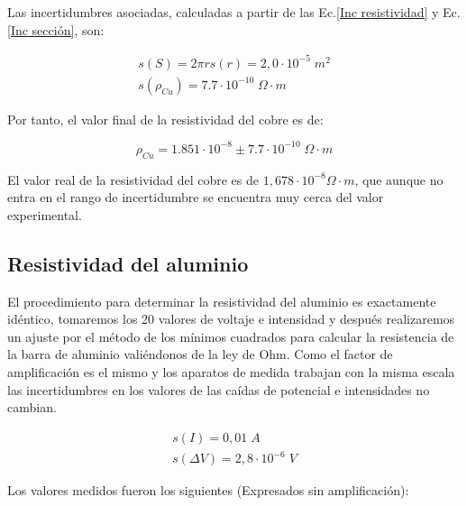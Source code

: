 \documentclass[a4paper,12pt,titlepage]{article}
\begin{document}
Las incertidumbres asociadas, calculadas a partir de las Ec.\ref{Inc resistividad} y Ec.\ref{Inc sección}, son:

\begin{equation}
    \begin{gathered}
        s(S) = 2\pi r s(r) = 2,0 \cdot 10^{-5} \; m^2
        \\
        s(\rho_{Cu}) = 7.7 \cdot 10^{-10} \; \Omega \cdot m
    \end{gathered}
\end{equation}

Por tanto, el valor final de la resistividad del cobre es de:

\begin{equation}
    \rho_{Cu} = 1.851 \cdot 10^{-8} \pm 7.7 \cdot 10^{-10} \; \Omega \cdot m
\end{equation}

El valor real de la resistividad del cobre es de $1,678 \cdot 10^{-8} \Omega \cdot m$, que aunque no entra en el rango de incertidumbre se encuentra muy cerca del valor experimental.

\subsection{Resistividad del aluminio}

El procedimiento para determinar la resistividad del aluminio es exactamente idéntico, tomaremos los 20 valores de voltaje e intensidad y después realizaremos un ajuste por el método de los mínimos cuadrados para calcular la resistencia de la barra de aluminio valiéndonos de la ley de Ohm. Como el factor de amplificación es el mismo y los aparatos de medida trabajan con la misma escala las incertidumbres en los valores de las caídas de potencial e intensidades no cambian.

\begin{equation}
    \begin{gathered}
    s(I) = 0,01 \; A\\    
    s(\Delta V) = 2,8 \cdot 10^{-6} \; V
    \end{gathered}
\end{equation}

Los valores medidos fueron los siguientes (Expresados sin amplificación):
\end{document}
